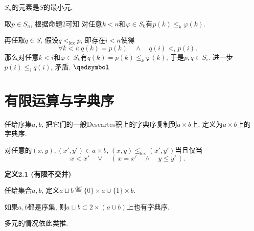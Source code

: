\documentclass[UTF8]{ctexart}
\begin{document}
\vspace{5pt}\hspace{-1em}{\kaishu 命题3.} $S_n$的元素是$S$的最小元.

\vspace{3pt}
取$p\in S_n$, 根据命题2可知
对任意$k<n$和$\varphi\in S_k$有$p(k)\leqslant_k\varphi(k)$.

再任取$q\in S$, 假设$q<_{\mathrm{lex}}p$, 即存在$i<n$使得
\[
    \forall k<i:q(k)=p(k)\quad\land\quad q(i)<_ip(i).
\]
那么对任意$k<i$和$\varphi\in S_k$有$q(k)=p(k)\leqslant_k\varphi(k)$,
于是$p,q\in S_i$. 进一步$p(i)\leqslant_iq(i)$, 矛盾. \hfill $\qedsymbol$





\vspace{20pt}

\section{有限运算与字典序}

任给序集$a,b$, 把它们的一般Descartes积上的字典序复制到$a\times b$上,
定义为$a\times b$上的字典序.

对任意的$(x,y),(x',y')\in a\times b$,
$(x,y)\leqslant_{\mathrm{lex}}(x',y')$当且仅当
\[
    x<x'\quad\lor\quad(\,x=x'\quad\land\quad y\leqslant y'\,).
\]

\vspace{10pt}

\hypertarget{sec:定义2.1}{}
\noindent\textbf{定义2.1 (有限不交并)}

任给集合$a,b$, 定义$a\sqcup b\overset{\mathrm{def}}{=}
\{0\}\times a\cup\{1\}\times b$.

如果$a,b$都是序集, 则$a\sqcup b\subset 2\times(a\cup b)$上也有字典序.

\vspace{10pt}

多元的情况依此类推.
\end{document}
